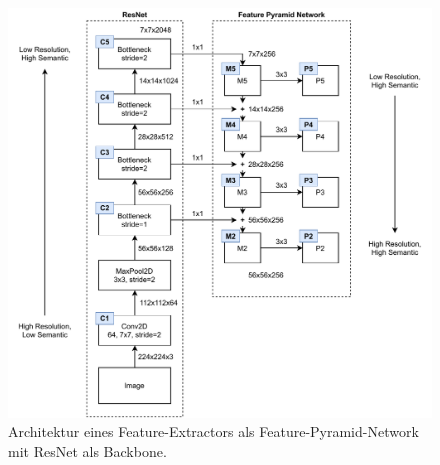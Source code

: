 \begin{figure}
    \includegraphics[width=\textwidth]{images/ResNet_FPN.pdf}
    \caption{Architektur eines Feature-Extractors als Feature-Pyramid-Network
    mit ResNet als Backbone.}
    \label{fig:resnet-fpn}
\end{figure}